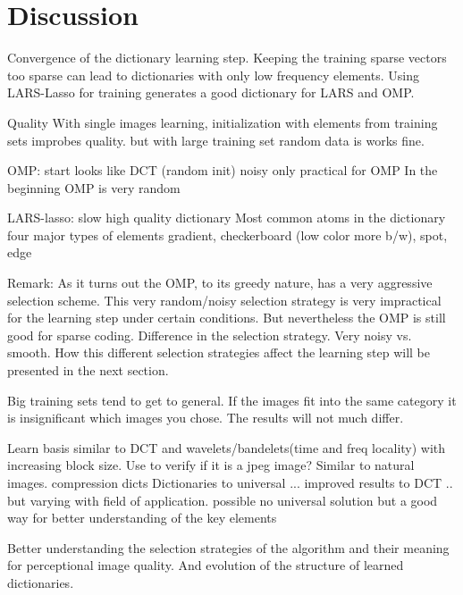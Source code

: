 \chapter{Discussion}

Convergence of the dictionary learning step.
Keeping the training sparse vectors too sparse can lead to dictionaries with
only low frequency elements. Using LARS-Lasso for training generates a good
dictionary for LARS and OMP. 

Quality
With single images learning, initialization with elements from training sets
improbes quality. but with large training set random data is works fine.

OMP:
  start looks like DCT (random init)
  noisy
  only practical for OMP
  In the beginning OMP is very random

LARS-lasso:
  slow 
  high quality dictionary
  Most common atoms in the dictionary 
  four major types of elements
  gradient, checkerboard (low color more b/w), spot, edge


Remark:
As it turns out the OMP, to its greedy nature, has a very aggressive selection
scheme. This very random/noisy selection strategy is very impractical
for the \trainDL learning step under certain conditions. 
But nevertheless the OMP is still good for
sparse coding. 
Difference in the selection strategy.
Very noisy vs. smooth. 
How this different selection strategies affect the learning step will be
presented in the next section.

Big training sets tend to get to general.
If the images fit into the same category it is insignificant which images you
chose. The results will not much differ.

Learn basis similar to DCT and wavelets/bandelets(time and freq locality) with
increasing block size. Use to verify if it is a jpeg image?
Similar to natural images.
compression dicts
Dictionaries to universal ... improved results to DCT .. but varying with field
of application. possible no universal solution but a good way for better
understanding of the key elements


Better understanding the selection strategies of the algorithm and their
meaning for perceptional image quality. And evolution of the structure of
learned dictionaries. 

